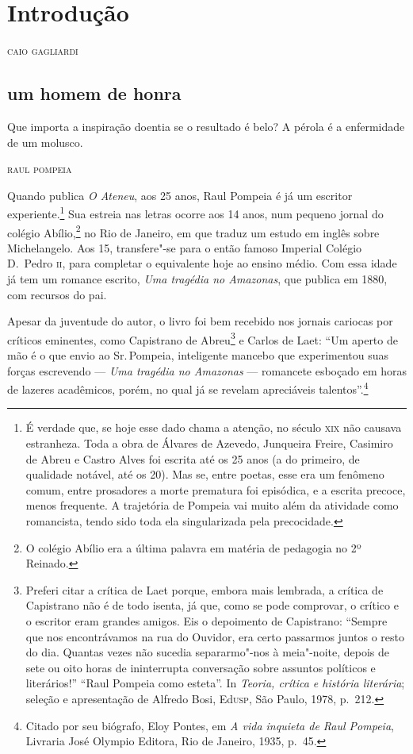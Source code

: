 \chapter[Introdução, \emph{por Caio Gagliardi}]{Introdução}

\begin{flushright}
\textsc{caio gagliardi}
\end{flushright}

\section*{um homem de honra}

\epigraph{Que importa a inspiração doentia se o resultado é belo? A pérola é a enfermidade de um molusco.}{\textsc{raul pompeia}}

\noindent{}Quando publica \textit{O
Ateneu}, aos 25 anos, Raul Pompeia é já um escritor
experiente.\footnote{ É verdade que, se hoje esse dado chama a
atenção, no século \textsc{xix} não causava estranheza. Toda a obra de Álvares
de Azevedo, Junqueira Freire, Casimiro de Abreu e Castro Alves foi
escrita até os 25 anos (a do primeiro, de qualidade notável, até os
20). Mas se, entre poetas, esse era um fenômeno comum, entre prosadores
a morte prematura foi episódica, e a escrita precoce, menos frequente.
A trajetória de Pompeia vai muito além da atividade como romancista,
tendo sido toda ela singularizada pela precocidade.}
Sua estreia nas letras ocorre aos 14 anos, num pequeno jornal do
colégio Abílio,\footnote{O colégio Abílio era a
última palavra em matéria de pedagogia no 2º Reinado.} no Rio de Janeiro, 
em que traduz um estudo em inglês sobre
Michelangelo. Aos 15, transfere"-se para o então famoso Imperial
Colégio D.~Pedro \textsc{ii}, para completar o equivalente hoje ao ensino médio.
Com essa idade já tem um romance escrito, \textit{Uma
tragédia no Amazonas}, que publica em 1880, com recursos do pai.


Apesar da juventude do autor, o livro foi bem recebido
nos jornais cariocas por críticos eminentes, como Capistrano de
Abreu\footnote{ Preferi citar a crítica de Laet porque, embora mais
lembrada, a crítica de Capistrano não é de todo isenta, já que, como se
pode comprovar, o crítico e o escritor eram grandes amigos. Eis o
depoimento de Capistrano: ``Sempre que nos encontrávamos na rua do
Ouvidor, era certo passarmos juntos o resto do dia. Quantas vezes não
sucedia separarmo"-nos à meia"-noite, depois de sete ou oito horas de
ininterrupta conversação sobre assuntos políticos e literários!'' ``Raul
Pompeia como esteta''. In \textit{Teoria, crítica e história literária};
seleção e apresentação de Alfredo Bosi, Ed\textsc{usp}, São Paulo, 1978, p.~212.}
e Carlos de Laet: ``Um aperto de mão é o que envio ao
Sr.\,Pompeia, inteligente mancebo que experimentou suas forças
escrevendo --- \textit{Uma tragédia no
Amazonas} --- romancete esboçado em horas de lazeres
acadêmicos, porém, no qual já se revelam apreciáveis
talentos''.\footnote{ Citado por seu biógrafo, Eloy Pontes, em
\textit{A vida inquieta de Raul Pompeia}, Livraria José
Olympio Editora, Rio de Janeiro, 1935, p.~45.}

